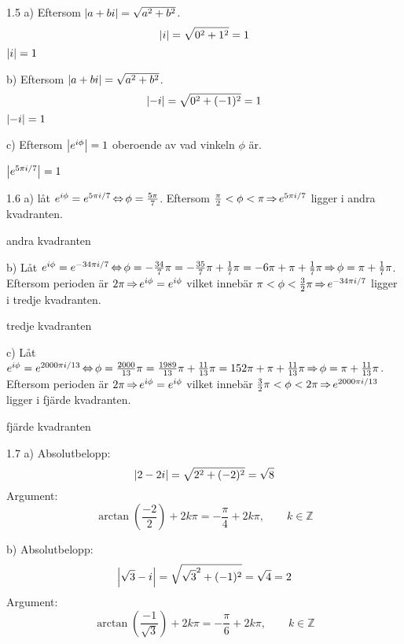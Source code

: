 \begin{task}{1.5 a)}
	Eftersom $\left|a+bi\right|=\sqrt{a^2+b^2}$.
	\[\left|i\right|=\sqrt{0^2+1^2}=1\]
	\ans $\left|i\right|=1$
\end{task}

\begin{task}{b)}
	Eftersom $\left|a+bi\right|=\sqrt{a^2+b^2}$.
	\[\left|-i\right|=\sqrt{0^2+(-1)^2}=1\]
	\ans $\left|-i\right|=1$
\end{task}

\begin{task}{c)}
	Eftersom $\left|e^{i\phi}\right|=1$ oberoende av vad vinkeln $\phi$ är.
	
	\ans $\left|e^{5\pi i/7}\right|=1$
\end{task}

\begin{task}{1.6 a)}
	låt $e^{i\phi}=e^{5\pi i/7} \operatorname{\Leftrightarrow} \phi=\frac{5\pi}{7}$. Eftersom $\frac{\pi}{2}<\phi<\pi \operatorname{\Rightarrow} e^{5\pi i/7}$ ligger i andra kvadranten.
	
	\ans andra kvadranten
\end{task}

\begin{task}{b)}
	Låt 
	$e^{i\phi}=e^{-34\pi i/7} \operatorname{\Leftrightarrow} 
	\phi=
	-\frac{34}{7}\pi=
	-\frac{35}{7}\pi+\frac{1}{7}\pi=
	-6\pi+\pi+\frac{1}{7}\pi \operatorname{\Rightarrow}
	\phi=\pi+\frac{1}{7}\pi$.
	Eftersom perioden är $2\pi \operatorname{\Rightarrow} e^{i\phi} = e^{i\phi}$ vilket innebär $\pi<\phi<\frac{3}{2}\pi \operatorname{\Rightarrow} e^{-34\pi i/7}$ ligger i tredje kvadranten.
	
	\ans tredje kvadranten
\end{task}

\begin{task}{c)}
	Låt 
	$e^{i\phi}=e^{2000\pi i/13} \operatorname{\Leftrightarrow} 
	\phi=
	\frac{2000}{13}\pi=
	\frac{1989}{13}\pi+\frac{11}{13}\pi=
	152\pi+\pi+\frac{11}{13}\pi \operatorname{\Rightarrow}
	\phi=\pi+\frac{11}{13}\pi$.
	Eftersom perioden är $2\pi \operatorname{\Rightarrow} e^{i\phi} = e^{i\phi}$ vilket innebär $\frac{3}{2}\pi<\phi<2\pi \operatorname{\Rightarrow} e^{2000\pi i/13}$ ligger i fjärde kvadranten.
	
	\ans fjärde kvadranten
\end{task}

\begin{task}{1.7 a)}
	Absolutbelopp:
	\[\left|2-2i\right|=\sqrt{2^2+(-2)^2}=\sqrt{8}\]
	Argument:
	\[\arctan\left(\frac{-2}{2}\right)+2k\pi=-\frac{\pi}{4}+2k\pi, \qquad k\in\mathbb{Z}\]
\end{task}

\begin{task}{b)}
	Absolutbelopp:
	\[\left|\sqrt{3}-i\right|=\sqrt{\sqrt{3}^2+(-1)^2}=\sqrt{4}=2\]
	Argument:
	\[\arctan\left(\frac{-1}{\sqrt{3}}\right)+2k\pi=-\frac{\pi}{6}+2k\pi, \qquad k\in\mathbb{Z}\]
\end{task}

